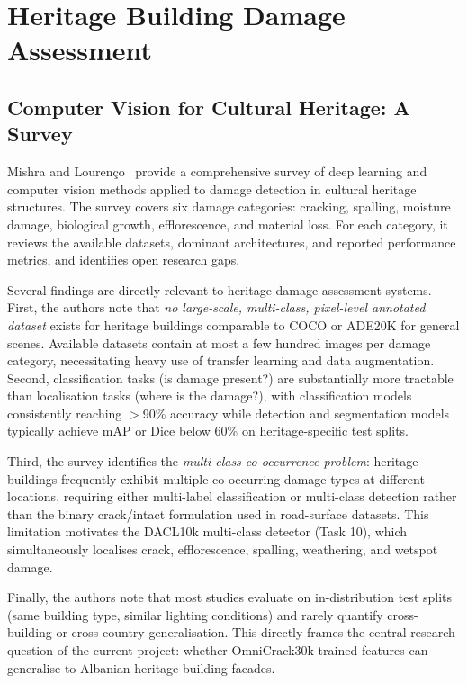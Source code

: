 \documentclass[12pt,a4paper]{article}
\begin{document}
\section{Heritage Building Damage Assessment}
\label{surv:sec:heritage}

\subsection{Computer Vision for Cultural Heritage: A Survey}

Mishra and Louren\c{c}o~\cite{surv:mishra2024heritage} provide a comprehensive survey of deep learning and computer vision methods applied to damage detection in cultural heritage structures. The survey covers six damage categories: cracking, spalling, moisture damage, biological growth, efflorescence, and material loss. For each category, it reviews the available datasets, dominant architectures, and reported performance metrics, and identifies open research gaps.

Several findings are directly relevant to heritage damage assessment systems. First, the authors note that \textit{no large-scale, multi-class, pixel-level annotated dataset} exists for heritage buildings comparable to COCO or ADE20K for general scenes. Available datasets contain at most a few hundred images per damage category, necessitating heavy use of transfer learning and data augmentation. Second, classification tasks (is damage present?) are substantially more tractable than localisation tasks (where is the damage?), with classification models consistently reaching $>$90\% accuracy while detection and segmentation models typically achieve mAP or Dice below 60\% on heritage-specific test splits.

Third, the survey identifies the \textit{multi-class co-occurrence problem}: heritage buildings frequently exhibit multiple co-occurring damage types at different locations, requiring either multi-label classification or multi-class detection rather than the binary crack/intact formulation used in road-surface datasets. This limitation motivates the DACL10k multi-class detector (Task 10), which simultaneously localises crack, efflorescence, spalling, weathering, and wetspot damage.

Finally, the authors note that most studies evaluate on in-distribution test splits (same building type, similar lighting conditions) and rarely quantify cross-building or cross-country generalisation. This directly frames the central research question of the current project: whether OmniCrack30k-trained features can generalise to Albanian heritage building facades.
\end{document}
